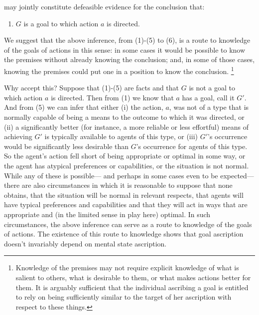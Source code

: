 \documentclass[12pt,a4paper]{extarticle}
\begin{document}
%
may jointly constitute defeasible evidence for the conclusion that:
%
\begin{enumerate}[resume]
\item $G$ is a goal to which action $a$ is directed.
\end{enumerate}
%
We suggest that the above inference, from (1)-(5) to (6), is a route to knowledge of the goals of actions in this sense:
in some cases
it would be possible to know the premises without already knowing the conclusion;
and, 
in some of those cases,
knowing the premises could put one in a position to know the conclusion.%
\footnote{
Knowledge of the premises may not require explicit knowledge of 
	what is salient to others,
	what is desirable to them,
	or what makes actions better for them.
It is arguably sufficient that
the individual ascribing a goal 
is entitled to 
rely on being sufficiently similar to the target of her ascription 
with respect to 
these things.
}

Why accept this?
Suppose that 
	(1)-(5) are facts 
and that
	$G$ is not a goal to which action $a$ is directed.
Then from (1) we know that $a$ has a goal, call it $G'$.
And from (5) we can infer that either 
(i) 
the action, $a$, was not of a type that is normally capable 
of being a means to the outcome to which it was directed,
or
(ii) 
a significantly better (for instance, a more reliable or less effortful) means of achieving $G'$ is typically available to agents of this type,
or
(iii)
$G'$'s occurrence would be significantly less desirable than $G$'s occurrence for agents of this type.
So the agent's action fell short of being appropriate or optimal in some way,
or the agent has atypical preferences or capabilities,
or the situation is not normal.
While any of these is possible---%
and perhaps in some cases even to be expected---%
there are also circumstances in which it is reasonable to suppose that none obtains,
that the situation will be normal in relevant respects,
that agents will have typical preferences and capabilities 
and that they will act in ways that are appropriate and (in the limited sense in play here) optimal.
In such circumstances, the above inference can serve as a route to knowledge of the goals of actions.
The existence of this route to knowledge shows that goal ascription doesn't invariably depend on mental state ascription.
\end{document}
